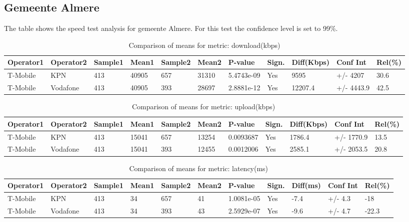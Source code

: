 \documentclass[]{article}
\begin{document}
\normalsize

\newpage

\subsection{Gemeente Almere}\label{gemeente-almere}

The table shows the speed test analysis for gemeente Almere. For this
test the confidence level is set to 99\%.

\begin{table}[ht]
\centering
{\footnotesize
\begin{tabular}{lllllllllll}
  \hline
Operator1 & Operator2 & Sample1 & Mean1 & Sample2 & Mean2 & P-value & Sign. & Diff(Kbps) & Conf Int & Rel(\%) \\ 
  \hline
T-Mobile & KPN & 413 & 40905 & 657 & 31310 & 5.4743e-09 & Yes & 9595 & +/- 4207 & 30.6 \\ 
  T-Mobile & Vodafone & 413 & 40905 & 393 & 28697 & 2.8881e-12 & Yes & 12207.4 & +/- 4443.9 & 42.5 \\ 
   \hline
\end{tabular}
}
\caption{Comparison of means for metric: download(kbps)} 
\end{table}\begin{table}[ht]
\centering
{\footnotesize
\begin{tabular}{lllllllllll}
  \hline
Operator1 & Operator2 & Sample1 & Mean1 & Sample2 & Mean2 & P-value & Sign. & Diff(Kbps) & Conf Int & Rel(\%) \\ 
  \hline
T-Mobile & KPN & 413 & 15041 & 657 & 13254 & 0.0093687 & Yes & 1786.4 & +/- 1770.9 & 13.5 \\ 
  T-Mobile & Vodafone & 413 & 15041 & 393 & 12455 & 0.0012006 & Yes & 2585.1 & +/- 2053.5 & 20.8 \\ 
   \hline
\end{tabular}
}
\caption{Comparison of means for metric: upload(kbps)} 
\end{table}\begin{table}[ht]
\centering
{\footnotesize
\begin{tabular}{lllllllllll}
  \hline
Operator1 & Operator2 & Sample1 & Mean1 & Sample2 & Mean2 & P-value & Sign. & Diff(ms) & Conf Int & Rel(\%) \\ 
  \hline
T-Mobile & KPN & 413 & 34 & 657 & 41 & 1.0081e-05 & Yes & -7.4 & +/- 4.3 & -18 \\ 
  T-Mobile & Vodafone & 413 & 34 & 393 & 43 & 2.5929e-07 & Yes & -9.6 & +/- 4.7 & -22.3 \\ 
   \hline
\end{tabular}
}
\caption{Comparison of means for metric: latency(ms)} 
\end{table}
\end{document}
